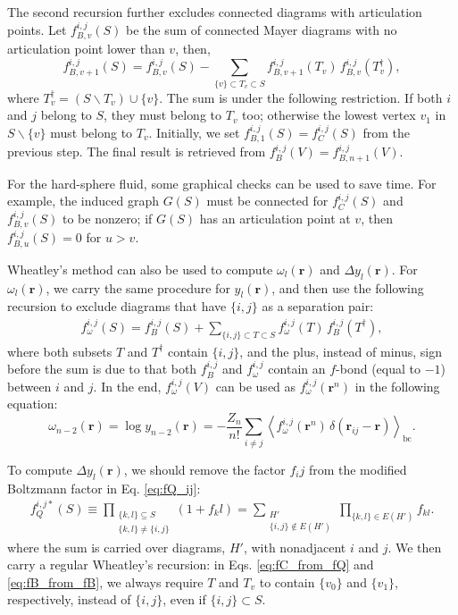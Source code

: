 \documentclass[aip,jcp,preprint,superscriptaddress,showpacs,preprintnumbers,amsmath,amssymb]{revtex4-1}
\numberwithin{equation}{section}
\newcommand{\vct}[1]{\mathbf{#1}}
\providecommand{\vr}{} %
\renewcommand{\vr}{\vct{r}}
\begin{document}
The second recursion further excludes connected diagrams
with articulation points.
%
Let $f_{B,v}^{i,j}(S)$ be the sum of connected Mayer diagrams
with no articulation point lower than $v$,
then\cite{wheatley2013},
%
%
%
\begin{equation}
f_{B,v+1}^{i,j}(S)
=
f_{B,v}^{i,j}(S)
-
\sum_{\{v\} \subset T_v \subset S}
f_{B, v+1}^{i,j}(T_v)
\,
f_{B,v}^{i,j}(T_v^\dagger),
\label{eq:fB_from_fB}
\end{equation}
%
%
%
where
$T_v^\dagger = \left(S \backslash T_v\right) \cup \{v\}$.
%
The sum is under the following restriction.
%
If both $i$ and $j$ belong to $S$,
they must belong to $T_v$ too;
otherwise the lowest vertex $v_1$ in $S \backslash \{v\}$
must belong to $T_v$.
%
Initially,
we set $f_{B,1}^{i,j}(S) = f_C^{i,j}(S)$
from the previous step.
%
The final result is retrieved from
$f_B^{i,j}(V) = f_{B, n+1}^{i,j}(V)$.



For the hard-sphere fluid,
some graphical checks\cite{zhang2014}
can be used to save time.
%
For example,
the induced graph $G(S)$ must be connected for
$f_C^{i,j}(S)$ and $f_{B,v}^{i,j}(S)$
to be nonzero;
%
if $G(S)$ has an articulation point at $v$,
then $f_{B,u}^{i,j}(S) = 0$ for $u > v$.



Wheatley's method can also be used to compute
$\omega_l(\vr)$ and $\Delta y_l(\vr)$.
%
For $\omega_l(\vr)$,
we carry the same procedure for $y_l(\vr)$,
and then use the following recursion to
exclude diagrams that have $\{i, j\}$
as a separation pair:
%
\begin{align*}
f_\omega^{i,j}(S)
=
f_B^{i,j}(S)
+
\sum_{\{i,j\} \subset T \subset S}
f_\omega^{i,j}(T) \, f_B^{i,j}(T^\dagger),
\end{align*}
%
where both subsets $T$ and $T^\dagger$
contain $\{i, j\}$,
and the plus, instead of minus,
sign before the sum is due to that
both $f_B^{i,j}$ and $f_\omega^{i,j}$
contain an $f$-bond (equal to $-1$)
between $i$ and $j$.
%
In the end,
$f_\omega^{i,j}(V)$
can be used as $f_\omega^{i,j}(\vr^n)$
in the following equation:
%
%
%
\[
\omega_{n-2}(\vr)
=
\log y_{n-2}(\vr)
=
- \frac{Z_n}{n!}
\sum_{i\ne j}
  \left\langle
    f_\omega^{i,j}(\vr^n) \, \delta(\vr_{ij} - \vr)
  \right\rangle_\mathrm{bc}.
\]



To compute $\Delta y_l(\vr)$,
we should remove the factor $f_ij$
from the modified Boltzmann factor in Eq. \eqref{eq:fQ_ij}:
%
%
%
\begin{align*}
f_Q^{i,j*}(S)
\equiv
\prod_{\substack{
\{k,l\} \subseteq S \\
\{k,l\} \ne \{i, j\}
}}
  (1 + f_kl)
=
\sum_{\substack{
H' \\
\{i,j\} \notin E(H')
}}
\prod_{\{k,l\} \in E(H')}
f_{kl}.
\end{align*}
%
%
%
where the sum is carried over diagrams, $H'$,
with nonadjacent $i$ and $j$.
%
We then carry a regular Wheatley's recursion:
in Eqs. \eqref{eq:fC_from_fQ} and \eqref{eq:fB_from_fB},
we always require $T$ and $T_v$
to contain $\{v_0\}$ and $\{v_1\}$, respectively,
instead of $\{i, j\}$,
even if $\{i, j\} \subset S$.
\end{document}
